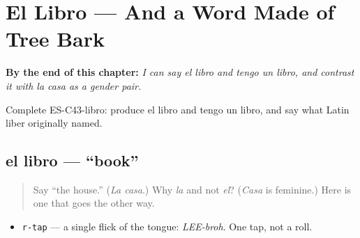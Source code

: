 
\chapter{El Libro --- And a Word Made of Tree Bark}
\label{ch:noun-libro}

\begin{chapteropening}
\textbf{By the end of this chapter:} \emph{I can say el libro and tengo un libro, and contrast it with la casa as a gender pair.}

Complete ES-C43-libro: produce el libro and tengo un libro, and say what Latin liber originally named.
\end{chapteropening}

\section[el libro]{el libro — \textquotedblleft{}book\textquotedblright{}}

\label{lesson:ES-C43-libro}



\begin{quote}
Say \textquotedblleft{}the house.\textquotedblright{} (\emph{La casa}.) Why \emph{la} and not \emph{el}? (\emph{Casa} is feminine.) Here is one that goes the other way.
\end{quote}

\begin{sounds}
\begin{itemize}
\raggedright
  \item \texttt{r-tap} — a single flick of the tongue: \emph{LEE-broh}. One tap, not a roll.
\end{itemize}
\end{sounds}

